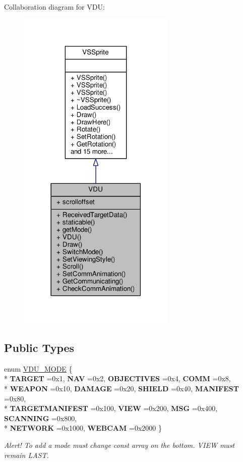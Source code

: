 Collaboration diagram for V\+DU\+:
\nopagebreak
\begin{figure}[H]
\begin{center}
\leavevmode
\includegraphics[width=213pt]{d7/d5e/classVDU__coll__graph}
\end{center}
\end{figure}
\subsection*{Public Types}
\begin{DoxyCompactItemize}
\item 
enum \hyperlink{classVDU_a14796b7dcf1bee936e197532d15ee4e6}{V\+D\+U\+\_\+\+M\+O\+DE} \{ \\*
{\bfseries T\+A\+R\+G\+ET} =0x1, 
{\bfseries N\+AV} =0x2, 
{\bfseries O\+B\+J\+E\+C\+T\+I\+V\+ES} =0x4, 
{\bfseries C\+O\+MM} =0x8, 
\\*
{\bfseries W\+E\+A\+P\+ON} =0x10, 
{\bfseries D\+A\+M\+A\+GE} =0x20, 
{\bfseries S\+H\+I\+E\+LD} =0x40, 
{\bfseries M\+A\+N\+I\+F\+E\+ST} =0x80, 
\\*
{\bfseries T\+A\+R\+G\+E\+T\+M\+A\+N\+I\+F\+E\+ST} =0x100, 
{\bfseries V\+I\+EW} =0x200, 
{\bfseries M\+SG} =0x400, 
{\bfseries S\+C\+A\+N\+N\+I\+NG} =0x800, 
\\*
{\bfseries N\+E\+T\+W\+O\+RK} =0x1000, 
{\bfseries W\+E\+B\+C\+AM} =0x2000
 \}\hypertarget{classVDU_a14796b7dcf1bee936e197532d15ee4e6}{}\label{classVDU_a14796b7dcf1bee936e197532d15ee4e6}
\begin{DoxyCompactList}\small\item\em Alert! To add a mode must change const array on the bottom. V\+I\+EW must remain L\+A\+ST. \end{DoxyCompactList}
\end{DoxyCompactItemize}
